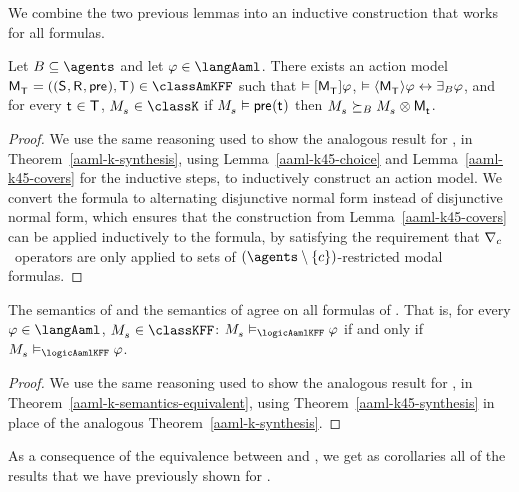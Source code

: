 We combine the two previous lemmas into an inductive construction that works for all formulas.

\begin{theorem}\label{aaml-k45-synthesis}
Let $\agentsB \subseteq \agents$ and let $\phi \in \langAaml$.
There exists an action model $\aPModelAndTuple{\aStatesT} \in \classAmKFF$ such that 
$\entails \actionA{\aPModel{\aStatesT}} \phi$,
$\entails \actionE{\aPModel{\aStatesT}} \phi \iff \someactsBs \phi$, and
for every $\aStateT \in \aStatesT$, $\kPModel{\kStateS} \in \classK$ if $\kPModel{\kStateS} \entails \aPrecondition(\aStateT)$ then $\kPModel{\kStateS} \simulatesBs \kPModel{\kStateS} \exec \aPModel{\aStateT}$.
\end{theorem}

\begin{proof}[Proof]
We use the same reasoning used to show the analogous result for \logicAamlK{}, in Theorem~\ref{aaml-k-synthesis}, using Lemma~\ref{aaml-k45-choice} and Lemma~\ref{aaml-k45-covers} for the inductive steps, to inductively construct an action model.
We convert the formula to alternating disjunctive normal form instead of disjunctive normal form, which ensures that the construction from Lemma~\ref{aaml-k45-covers} can be applied inductively to the formula, by satisfying the requirement that $\nabla_{c}$~operators are only applied to sets of $(\agents \setminus \{\agentC\})$-restricted modal formulas.
\end{proof}

\begin{theorem}\label{aaml-k45-semantics-equivalent}
The semantics of \logicAamlKFF{} and the semantics of \logicRamlKFF{} agree on all formulas of \langAaml{}.
That is, for every $\phi \in \langAaml$, $\kPModel{\kStateS} \in \classKFF$: $\kPModel{\kStateS} \entails_\logicAamlKFF \phi$ if and only if $\kPModel{\kStateS} \entails_\logicAamlKFF \phi$.
\end{theorem}

\begin{proof}
We use the same reasoning used to show the analogous result for \logicAamlK{}, in Theorem~\ref{aaml-k-semantics-equivalent}, using Theorem~\ref{aaml-k45-synthesis} in place of the analogous Theorem~\ref{aaml-k-synthesis}.
\end{proof}

As a consequence of the equivalence between \logicAamlKFF{} and \logicRamlKFF{}, we get as corollaries all of the results that we have previously shown for \logicRamlKFF{}.

